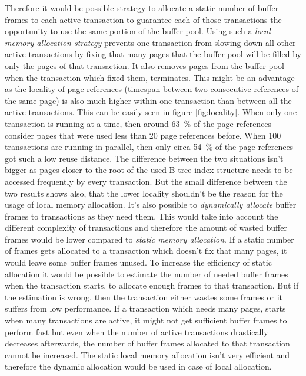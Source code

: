 	Therefore it would be possible strategy to allocate a static number of buffer frames to each active transaction to guarantee each of those transactions the opportunity to use the same portion of the buffer pool. Using such a \emph{local memory allocation strategy} prevents one transaction from slowing down all other active transactions by fixing that many pages that the buffer pool will be filled by only the pages of that transaction. It also removes pages from the buffer pool when the transaction which fixed them, terminates. This might be an advantage as the locality of page references (timespan between two consecutive references of the same page) is also much higher within one transaction than between all the active transactions. This can be easily seen in figure \ref{fig:locality}. When only one transaction is running at a time, then around \SI{63}{\percent} of the page references consider pages that were used less than 20 page references before. When 100 transactions are running in parallel, then only circa \SI{54}{\percent} of the page references got such a low reuse distance. The difference between the two situations isn't bigger as pages closer to the root of the used B-tree index structure needs to be accessed frequently by every transaction. But the small difference between the two results shows also, that the lower locality shouldn't be the reason for the usage of local memory allocation. It's also possible to \emph{dynamically allocate} buffer frames to transactions as they need them. This would take into account the different complexity of transactions and therefore the amount of wasted buffer frames would be lower compared to \emph{static memory allocation}. If a static number of frames gets allocated to a transaction which doesn't fix that many pages, it would leave some buffer frames unused. To increase the efficiency of static allocation it would be possible to estimate the number of needed buffer frames when the transaction starts, to allocate enough frames to that transaction. But if the estimation is wrong, then the transaction either wastes some frames or it suffers from low performance. If a transaction which needs many pages, starts when many transactions are active, it might not get sufficient buffer frames to perform fast but even when the number of active transactions drastically decreases afterwards, the number of buffer frames allocated to that transaction cannot be increased. The static local memory allocation isn't very efficient and therefore the dynamic allocation would be used in case of local allocation.
	
